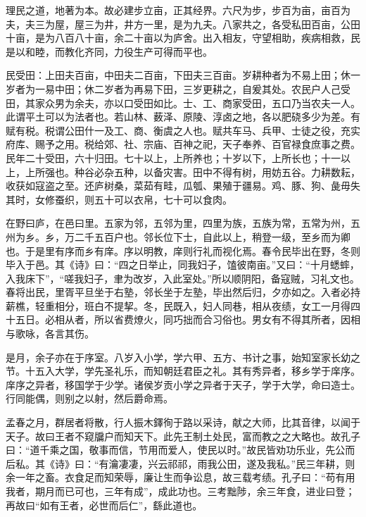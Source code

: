 \documentclass[12pt,UTF8]{ctexbook}
\begin{document}
理民之道，地著为本。故必建步立亩，正其经界。六尺为步，步百为亩，亩百为夫，夫三为屋，屋三为井，井方一里，是为九夫。八家共之，各受私田百亩，公田十亩，是为八百八十亩，余二十亩以为庐舍。出入相友，守望相助，疾病相救，民是以和睦，而教化齐同，力役生产可得而平也。



民受田：上田夫百亩，中田夫二百亩，下田夫三百亩。岁耕种者为不易上田；休一岁者为一易中田；休二岁者为再易下田，三岁更耕之，自爰其处。农民户人己受田，其家众男为余夫，亦以口受田如比。士、工、商家受田，五口乃当农夫一人。此谓平土可以为法者也。若山林、薮泽、原陵、淳卤之地，各以肥硗多少为差。有赋有税。税谓公田什一及工、商、衡虞之人也。赋共车马、兵甲、士徒之役，充实府库、赐予之用。税给郊、社、宗庙、百神之祀，天子奉养、百官禄食庶事之费。民年二十受田，六十归田。七十以上，上所养也；十岁以下，上所长也；十一以上，上所强也。种谷必杂五种，以备灾害。田中不得有树，用妨五谷。力耕数耘，收获如寇盗之至。还庐树桑，菜茹有畦，瓜瓠、果殖于疆易。鸡、豚、狗、彘毋失其时，女修蚕织，则五十可以衣帛，七十可以食肉。



在野曰庐，在邑曰里。五家为邻，五邻为里，四里为族，五族为常，五常为州，五州为乡。乡，万二千五百户也。邻长位下士，自此以上，稍登一级，至乡而为卿也。于是里有序而乡有庠。序以明教，庠则行礼而视化焉。春令民毕出在野，冬则毕入于邑。其《诗》曰：“四之日举止，同我妇子，馌彼南亩。”又曰：“十月蟋蟀，入我床下”，“嗟我妇子，聿为改岁，入此室处。”所以顺阴阳，备寇贼，习礼文也。春将出民，里胥平旦坐于右塾，邻长坐于左塾，毕出然后归，夕亦如之。入者必持薪樵，轻重相分，班白不提挈。冬，民既入，妇人同巷，相从夜绩，女工一月得四十五日。必相从者，所以省费燎火，同巧拙而合习俗也。男女有不得其所者，因相与歌咏，各言其伤。



是月，余子亦在于序室。八岁入小学，学六甲、五方、书计之事，始知室家长幼之节。十五入大学，学先圣礼乐，而知朝廷君臣之礼。其有秀异者，移乡学于庠序。庠序之异者，移国学于少学。诸侯岁贡小学之异者于天子，学于大学，命曰造士。行同能偶，则别之以射，然后爵命焉。



孟春之月，群居者将散，行人振木鐸徇于路以采诗，献之大师，比其音律，以闻于天子。故曰王者不窥牖户而知天下。此先王制土处民，富而教之之大略也。故孔子曰：“道千乘之国，敬事而信，节用而爱人，使民以时。”故民皆劝功乐业，先公而后私。其《诗》曰：“有瀹凄凄，兴云祁祁，雨我公田，遂及我私。”民三年耕，则余一年之畜。衣食足而知荣辱，廉让生而争讼息，故三载考绩。孔子曰：“苟有用我者，期月而已可也，三年有成”，成此功也。三考黜陟，余三年食，进业曰登；再故曰“如有王者，必世而后仁”，繇此道也。
\end{document}
